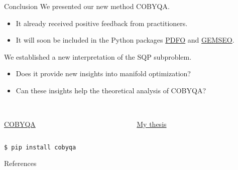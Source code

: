 \documentclass[
]{talk}
\begin{document}
\begin{frame}{Conclusion}
    We presented our new method COBYQA.
    \begin{itemize}
        \item It already received \alert{positive} feedback from practitioners.
        \item It will soon be included in the Python packages \href{https://www.pdfo.net}{PDFO} and \href{https://gemseo.readthedocs.io}{GEMSEO}.
    \end{itemize}

    We established a new interpretation of the SQP subproblem.
    \begin{itemize}
        \item Does it provide new insights into \alert{manifold optimization}?
        \item Can these insights help the theoretical analysis of COBYQA?
    \end{itemize}

    \begin{columns}
        \begin{column}{0.5\textwidth}
            \begin{center}
                \\[1ex]
                \href{https://www.cobyqa.com}{COBYQA}
            \end{center}
        \end{column}
        \begin{column}{0.5\textwidth}
            \begin{center}
                \\[1ex]
                \href{http://tomragonneau.com/documents/thesis.pdf}{My thesis}
            \end{center}
        \end{column}
    \end{columns}

    \medskip

    \begin{block}{}
        \texttt{\$ pip install cobyqa}
    \end{block}
\end{frame}


\appendix
\begin{frame}[t,allowframebreaks]{References}
    \printbibliography[heading=none]
\end{frame}
\end{document}
